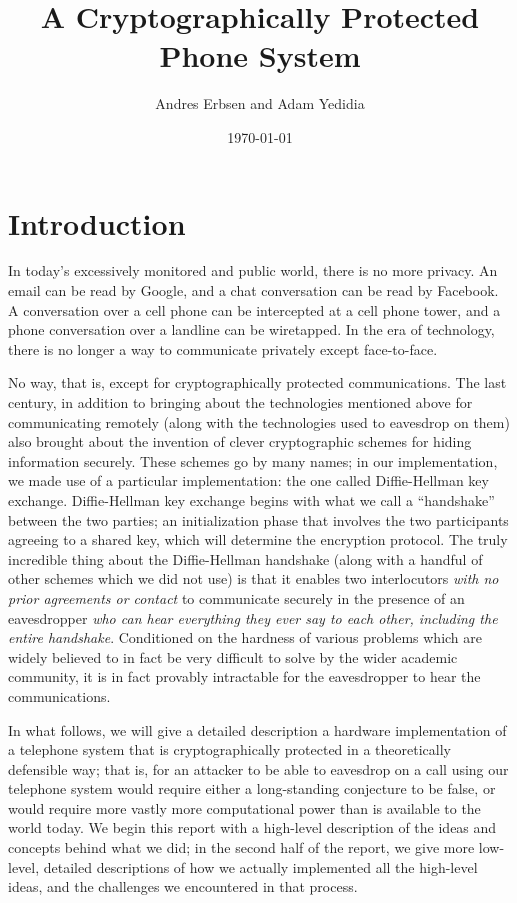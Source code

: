 \documentclass[a4paper]{report}
\title{A Cryptographically Protected Phone System}
\author{Andres Erbsen and Adam Yedidia}
\date{\today}
\begin{document}
\maketitle

\section{Introduction}

In today's excessively monitored and public world, there is no more privacy. An
email can be read by Google, and a chat conversation can be read by Facebook. A
conversation over a cell phone can be intercepted at a cell phone tower, and a
phone conversation over a landline can be wiretapped. In the era of technology,
there is no longer a way to communicate privately except face-to-face.

No way, that is, except for cryptographically protected communications. The last
century, in addition to bringing about the technologies mentioned above for
communicating remotely (along with the technologies used to eavesdrop on them)
also brought about the invention of clever cryptographic schemes for hiding
information securely. These schemes go by many names; in our implementation, we
made use of a particular implementation: the one called Diffie-Hellman key
exchange. Diffie-Hellman key exchange begins with what we call a ``handshake'' between the two parties; an initialization phase that involves the two participants agreeing to a shared key, which will %
determine the encryption protocol. The truly incredible thing about the Diffie-Hellman handshake (along
with a handful of other schemes which we did not use) is that it enables two
interlocutors \emph{with no prior agreements or contact} to communicate securely
in the presence of an eavesdropper \emph{who can hear everything they ever say
to each other, including the entire handshake}. Conditioned on the hardness of various problems which are widely
believed to in fact be very difficult to solve by the wider academic community,
it is in fact provably intractable for the eavesdropper to hear the
communications.

In what follows, we will %
give a detailed description a hardware implementation of a telephone
system that is cryptographically protected in a theoretically defensible
way; that is, for an attacker to be able to eavesdrop on a call using our
telephone system would require either a long-standing conjecture to be false, or
would require more vastly more computational power than is available to the
world today. We begin this report with a high-level description of the ideas and concepts behind what we did; in the second half of the report, we give more low-level, detailed descriptions of how we actually implemented all the high-level ideas, and the challenges we encountered in that process.
\end{document}
